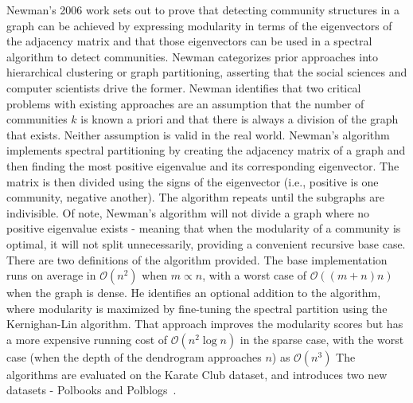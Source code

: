  \par{Newman's 2006 work sets out to prove that detecting community structures in a graph can be achieved by expressing modularity in terms of the eigenvectors of the adjacency matrix and that those eigenvectors can be used in a spectral algorithm to detect communities. Newman categorizes prior approaches into hierarchical clustering or graph partitioning, asserting that the social sciences and computer scientists drive the former. Newman identifies that two critical problems with existing approaches are an assumption that the number of communities $k$ is known a priori and that there is always a division of the graph that exists. Neither assumption is valid in the real world. Newman's algorithm implements spectral partitioning by creating the adjacency matrix of a graph and then finding the most positive eigenvalue and its corresponding eigenvector. The matrix is then divided using the signs of the eigenvector (i.e., positive is one community, negative another). The algorithm repeats until the subgraphs are indivisible. Of note, Newman's algorithm will not divide a graph where no positive eigenvalue exists - meaning that when the modularity of a community is optimal, it will not split unnecessarily, providing a convenient recursive base case. There are two definitions of the algorithm provided. The base implementation runs on average in $\mathcal{O}(n^2)$ when $m\propto n$, with a worst case of $\mathcal{O}((m+n)n)$ when the graph is dense. He identifies an optional addition to the algorithm, where modularity is maximized by fine-tuning the spectral partition using the Kernighan-Lin algorithm. That approach improves the modularity scores but has a more expensive running cost of $\mathcal{O}(n^2\log{n})$ in the sparse case, with the worst case (when the depth of the dendrogram approaches $n$) as $\mathcal{O}(n^3)$ The algorithms are evaluated on the Karate Club dataset, and introduces two new datasets - Polbooks and Polblogs~\cite{Newman2006}.}

